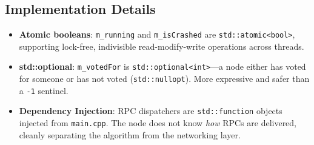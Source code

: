 \documentclass[11pt, a4paper]{article}
\begin{document}
\subsection{Implementation Details}
\begin{itemize}[leftmargin=*]
    \item \textbf{Atomic booleans}: \texttt{m\_running} and
          \texttt{m\_isCrashed} are \texttt{std::atomic<bool>}, supporting
          lock-free, indivisible read-modify-write operations across threads.
    \item \textbf{std::optional}: \texttt{m\_votedFor} is
          \texttt{std::optional<int>}---a node either has voted for someone
          or has not voted (\texttt{std::nullopt}). More expressive and
          safer than a \texttt{-1} sentinel.
    \item \textbf{Dependency Injection}: RPC dispatchers are
          \texttt{std::function} objects injected from \texttt{main.cpp}.
          The node does not know \textit{how} RPCs are delivered, cleanly
          separating the algorithm from the networking layer.
\end{itemize}
\end{document}

